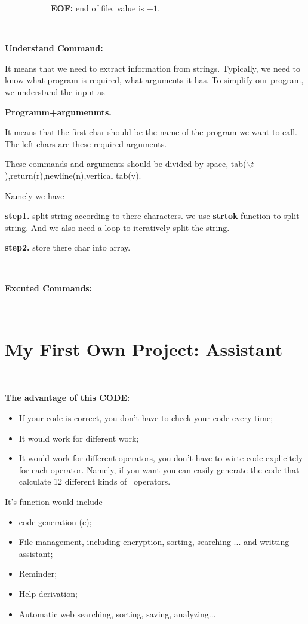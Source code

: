 \documentclass{article}
\begin{document}
\ \ \ \ \ \ \ \ \ \ \ {\bfseries{EOF:}} end of file. value is $- 1$.

\

{\bfseries{Understand Command:}}

It means that we need to extract information from strings. Typically, we need
to know what program is required, what arguments it has. To simplify our
program, we understand the input as

{\bfseries{Programm+argumenmts.}}

It means that the first char should be the name of the program we want to
call. The left chars are these required arguments.

These commands and arguments should be divided by space, tab($\backslash
t${\bfseries{}}),return(r),newline(n),vertical tab(v).

Namely we have

{\bfseries{step1.}} split string according to there characters. we use
{\bfseries{strtok}} function to split string. And we also need a loop to
iteratively split the string.

{\bfseries{step2.}} store there char into array.

\

{\bfseries{Excuted Commands:}}

\

\section{My First Own Project: {\bfseries{Assistant}}}

\

{\bfseries{The advantage of this CODE:}}
\begin{itemize}
  \item If your code is correct, you don't have to check your code every time;
  
  \item It would work for different work;
  
  \item It would work for different operators, you don't have to wirte code
  explicitely for each operator. Namely, if you want you can easily generate
  the code that calculate 12 different kinds of \ operators. 
\end{itemize}
It's function would include
\begin{itemize}
  \item code generation (c);
  
  \item File management, including encryption, sorting, searching ... and
  writting assistant;
  
  \item Reminder;
  
  \item Help derivation;
  
  \item Automatic web searching, sorting, saving, analyzing...
\end{itemize}
\end{document}
